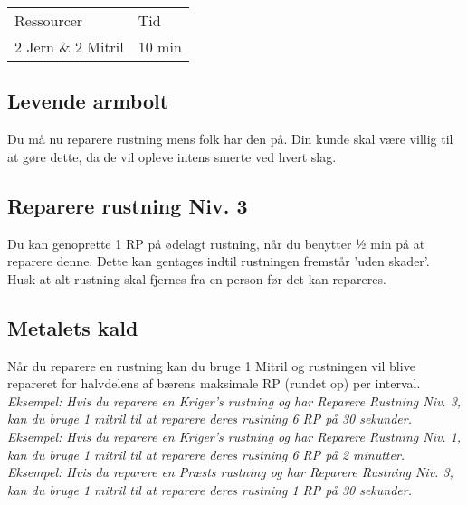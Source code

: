\begin{table}[H]
    \centering
    \begin{tabular}{|p{}|p{}|}
    \hline
    \rowcolor{cerulean!80}
    \multicolumn{2}{c}{Lås Niv. 3}\\
    \hline
    \rowcolor{cerulean!40}
         Ressourcer & Tid \\\hline
         2 Jern \& 2 Mitril & 10 min\\\hline
    \end{tabular}
\end{table}

\subsection{Levende armbolt}
Du må nu reparere rustning mens folk har den på. Din kunde skal være villig til at gøre dette, da de vil opleve intens smerte ved hvert slag.

\subsection{Reparere rustning Niv. 3}
Du kan genoprette 1 RP på ødelagt rustning, når du benytter ½ min på at reparere denne. Dette kan gentages indtil rustningen fremstår 'uden skader'.\\
Husk at alt rustning skal fjernes fra en person før det kan repareres.

\subsection{Metalets kald}
Når du reparere en rustning kan du bruge 1 Mitril og rustningen vil blive repareret for halvdelens af bærens maksimale RP (rundet op) per interval.\\
\textit{Eksempel: Hvis du reparere en Kriger's rustning og har Reparere Rustning Niv. 3, kan du bruge 1 mitril til at reparere deres rustning 6 RP på 30 sekunder.}\\
\textit{Eksempel: Hvis du reparere en Kriger's rustning og har Reparere Rustning Niv. 1, kan du bruge 1 mitril til at reparere deres rustning 6 RP på 2 minutter.}\\
\textit{Eksempel: Hvis du reparere en Præsts rustning og har Reparere Rustning Niv. 3, kan du bruge 1 mitril til at reparere deres rustning 1 RP på 30 sekunder.}